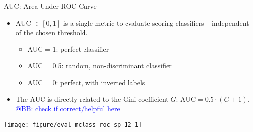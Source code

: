 \documentclass[11pt,compress,t,notes=noshow, xcolor=table]{beamer}
\newenvironment{knitrout}{}{} %
\begin{document}
\begin{vbframe}{AUC: Area Under ROC Curve}

\begin{itemize}
  \item AUC $\in [0,1]$ is a single metric to evaluate scoring classifiers --
  independent of the chosen threshold.
  \begin{itemize}
    \item AUC = 1: perfect classifier
    \item AUC = 0.5: random, non-discriminant classifier
    \item AUC = 0: perfect, with inverted labels
  \end{itemize}
  \item The AUC is directly related to the Gini coefficient $G$: 
  $\text{AUC} = 0.5 \cdot (G + 1)$. 
  \textcolor{blue}{@BB: check if correct/helpful here}
\end{itemize}

\begin{center}
  \texttt{[image: figure/eval\_mclass\_roc\_sp\_12\_1]}
\end{center}

\end{vbframe}


% 
% 
% 


% 
% 
% 



\endlecture
\end{document}

